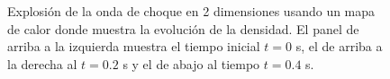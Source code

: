 \documentclass[12pt,a4paper]{book}
\begin{document}
\begin{figure}
    \caption{Explosión de la onda de choque en 2 dimensiones usando un mapa de calor donde muestra
    la evolución de la densidad. El panel de arriba a la izquierda muestra el tiempo inicial $t=0$ s,
    el de arriba a la derecha  al $t = 0.2$ s y el de abajo al tiempo $t = 0.4$ s. \label{fig:head_map}}
\end{figure}
\end{document}
